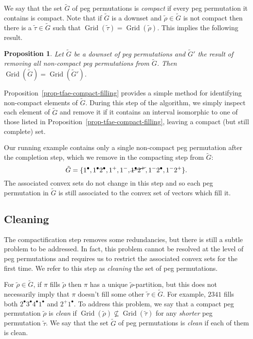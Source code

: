 \documentclass[10pt]{article}
\theoremstyle{plain}
\newtheorem{proposition}[theorem]{Proposition}
\theoremstyle{definition}
\newcommand{\Grid}{\operatorname{Grid}}
\newcommand{\p}[1]{#1^+}
\newcommand{\m}[1]{#1^-}
\renewcommand{\d}[1]{#1^{\bullet}}
\begin{document}
We say that the set $\tilde{G}$ of peg permutations is \emph{compact} if every peg permutation it contains is compact. Note that if $\tilde{G}$ is a downset and $\tilde{\rho} \in \tilde{G}$ is not compact then there is a $\tilde{\tau} \in \tilde{G}$ such that $\Grid(\tilde{\tau}) = \Grid(\tilde{\rho})$. This implies the following result.

\begin{proposition}\label{prop-compact-complete}
Let $\tilde{G}$ be a downset of peg permutations and $\tilde{G}'$ the result of removing all non-compact peg permutations from $\tilde{G}$. Then $\Grid(\tilde{G}) = \Grid(\tilde{G}')$. 
\end{proposition}

Proposition~\ref{prop-tfae-compact-filling} provides a simple method for identifying non-compact elements of $\tilde{G}$. During this step of the algorithm, we simply inspect each element of $\tilde{G}$ and remove it if it contains an interval isomorphic to one of those listed in Proposition~\ref{prop-tfae-compact-filling}, leaving a compact (but still complete) set. 

Our running example contains only a single non-compact peg permutation after the completion step, which we remove in the compacting step from $\tilde{G}$:
$$
\tilde{G} = \{\d 1, \d 1 \d 2, \p 1, \m 1, \cancel{\d 1 \p 2}, 
              \m 1 \d 2, \m 1 \p 2\}.
$$
The associated convex sets do not change in this step and so each peg permutation in $\tilde{G}$ is still associated to the convex set of vectors which fill it.

\subsection{Cleaning}

The compactification step removes some redundancies, but there is still a subtle problem to be addressed. In fact, this problem cannot be resolved at the level of peg permutations and requires us to restrict the associated convex sets for the first time. We refer to this step as \emph{cleaning} the set of peg permutations. 

For $\tilde{\rho}\in\tilde{G}$, if $\pi$ fills $\tilde{\rho}$ then $\pi$ has a unique $\tilde{\rho}$-partition, but this does not necessarily imply that $\pi$ doesn't fill some other $\tilde{\tau}\in\tilde{G}$. For example, $2341$ fills both $\d{2}\d{3}\d{4}\d{1}$ and $\p{2}\d{1}$. To address this problem, we say that a compact peg permutation $\tilde{\rho}$ is \emph{clean} if $\Grid(\tilde{\rho})\not\subseteq\Grid(\tilde{\tau})$ for any \emph{shorter} peg permutation $\tilde{\tau}$. We say that the set $\tilde{G}$ of peg permutations is \emph{clean} if each of them is clean.
\end{document}
